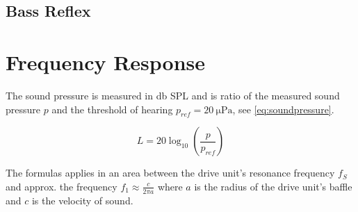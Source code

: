 \subsection{Bass Reflex}

\section{Frequency Response}
The sound pressure is measured in \si{\decibel} SPL and is ratio of the measured sound pressure $p$ and the threshold of hearing $p_{ref}=\SI{20}{\micro\pascal}$, see \cref{eq:soundpressure}.

\begin{equation}
L=20\log_{10}\left(\frac{p}{p_{ref}}\right)
\label{eq:soundpressure}
\end{equation}

The formulas applies in an area between the drive unit's resonance frequency $f_S$ and approx. the frequency $f_1\approx\frac{c}{2\pi a}$ where $a$ is the radius of the drive unit's baffle and $c$ is the velocity of sound. \cite[p.~41]{Elektroakustik}



\FloatBarrier
